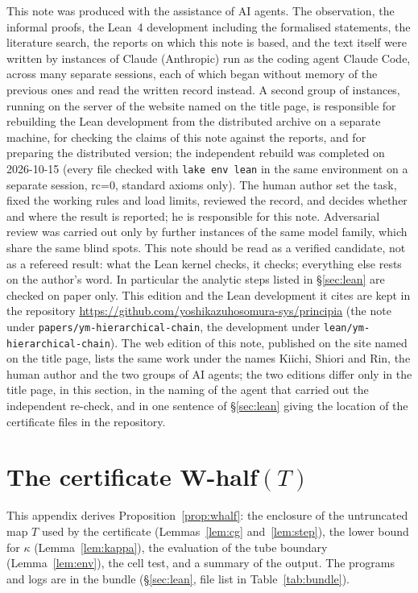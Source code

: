 \documentclass[11pt,a4paper]{article}
\theoremstyle{definition}
\theoremstyle{remark}
\newcommand{\code}[1]{\texttt{#1}}
\begin{document}
This note was produced with the assistance of AI agents. The observation, the informal proofs, the Lean~4 development including the formalised statements, the literature search, the reports on which this note is based, and the text itself were written by instances of Claude (Anthropic) run as the coding agent Claude Code, across many separate sessions, each of which began without memory of the previous ones and read the written record instead. A second group of instances, running on the server of the website named on the title page, is responsible for rebuilding the Lean development from the distributed archive on a separate machine, for checking the claims of this note against the reports, and for preparing the distributed version; the independent rebuild was completed on 2026-10-15 (every file checked with \code{lake env lean} in the same environment on a separate session, rc=0, standard axioms only). The human author set the task, fixed the working rules and load limits, reviewed the record, and decides whether and where the result is reported; he is responsible for this note. Adversarial review was carried out only by further instances of the same model family, which share the same blind spots. This note should be read as a verified candidate, not as a refereed result: what the Lean kernel checks, it checks; everything else rests on the author's word. In particular the analytic steps listed in \S\ref{sec:lean} are checked on paper only. This edition and the Lean development it cites are kept in the repository \url{https://github.com/yoshikazuhosomura-sys/principia} (the note under \texttt{papers/\allowbreak{}ym-hierarchical-chain}, the development under \texttt{lean/\allowbreak{}ym-hierarchical-chain}). The web edition of this note, published on the site named on the title page, lists the same work under the names Kiichi, Shiori and Rin, the human author and the two groups of AI agents; the two editions differ only in the title page, in this section, in the naming of the agent that carried out the independent re-check, and in one sentence of \S\ref{sec:lean} giving the location of the certificate files in the repository.

\appendix
\section{The certificate W-half\texorpdfstring{$(T)$}{(T)}}\label{app:whalf}

This appendix derives Proposition~\ref{prop:whalf}: the enclosure of the untruncated map $T$ used by the certificate (Lemmas~\ref{lem:cg} and~\ref{lem:step}), the lower bound for $\kappa$ (Lemma~\ref{lem:kappa}), the evaluation of the tube boundary (Lemma~\ref{lem:env}), the cell test, and a summary of the output.
The programs and logs are in the bundle (\S\ref{sec:lean}, file list in Table~\ref{tab:bundle}).
\end{document}
